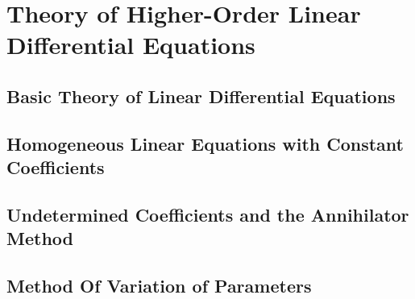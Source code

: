 \documentclass[../diffeq.tex]{subfiles}
\begin{document}
\chapter{Theory of Higher-Order Linear Differential Equations}
\section{Basic Theory of Linear Differential Equations}
\section{Homogeneous Linear Equations with Constant Coefficients}
\section{Undetermined Coefficients and the Annihilator Method}
\section{Method Of Variation of Parameters}
\end{document}
